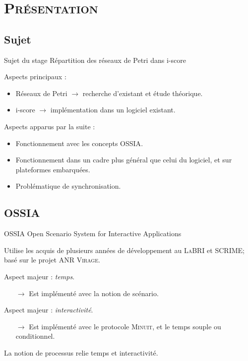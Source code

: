 \section{\scshape Présentation}
\subsection{Sujet}
\begin{frame}{Sujet du stage}
	{\large Répartition des réseaux de Petri dans i-score}
	
	Aspects principaux : 
	\begin{itemize}
		\item Réseaux de Petri $\rightarrow$ recherche d'existant et étude théorique.
		\item i-score $\rightarrow$ implémentation dans un logiciel existant.
	\end{itemize} 
	\vspace{1em}
	Aspects apparus par la suite : 
	\begin{itemize}
		\item Fonctionnement avec les concepts {OSSIA}.
		\item Fonctionnement dans un cadre plus général que celui du logiciel, et sur plateformes embarquées.
		\item Problématique de synchronisation.
	\end{itemize}
	
\end{frame}

\subsection{OSSIA}
\begin{frame}{OSSIA}
	{\large Open Scenario System for Interactive Applications}
	
	Utilise les acquis de plusieurs années de développement au \textsc{LaBRI} et \textsc{SCRIME}; basé sur le projet \textsc{ANR Virage}.
	
	\vspace{1em}
	Aspect majeur : \emph{temps}.
	\begin{itemize}
		\item[$\rightarrow$] Est implémenté avec la notion de scénario.
	\end{itemize}
	
	Aspect majeur : \emph{interactivité}.
	\begin{itemize}
		\item[$\rightarrow$] Est implémenté avec le protocole \textsc{Minuit}, et le temps souple ou conditionnel.
	\end{itemize}
		
	La notion de processus relie temps et interactivité.
\end{frame}

